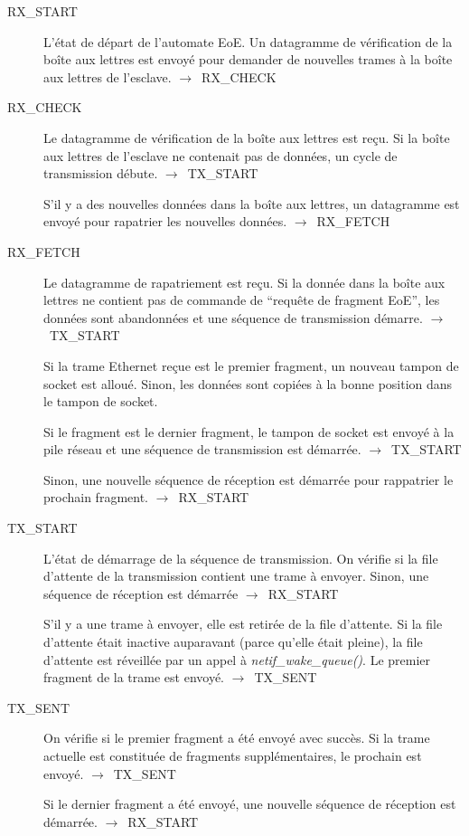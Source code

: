 \documentclass[a4paper,12pt,BCOR=6mm,bibtotoc,idxtotoc]{scrbook}
\begin{document}
\begin{description}
\item[RX\_START] L'\'etat de d\'epart de l'automate EoE.  Un datagramme de
  v\'erification de la bo\^ite aux lettres est envoy\'e pour demander de
  nouvelles trames \`a la bo\^ite aux lettres de
  l'esclave. $\rightarrow$~RX\_CHECK

\item[RX\_CHECK] Le datagramme de v\'erification de la bo\^ite aux lettres
  est re\c{c}u. Si la bo\^ite aux lettres de l'esclave ne contenait pas de
  donn\'ees, un cycle de transmission d\'ebute. $\rightarrow$~TX\_START

  S'il y a des nouvelles donn\'ees dans la bo\^ite aux lettres, un
  datagramme est envoy\'e pour rapatrier les nouvelles donn\'ees.
  $\rightarrow$~RX\_FETCH

\item[RX\_FETCH] Le datagramme de rapatriement est re\c{c}u.  Si la
  donn\'ee dans la bo\^ite aux lettres ne contient pas de commande de
  ``requ\^ete de fragment EoE'', les donn\'ees sont abandonn\'ees et une
  s\'equence de transmission d\'emarre.  $\rightarrow$~TX\_START

  Si la trame Ethernet re\c{c}ue est le premier fragment, un nouveau
  tampon de socket est allou\'e. Sinon, les donn\'ees sont copi\'ees
  \`a la bonne position dans le tampon de socket.

  Si le fragment est le dernier fragment, le tampon de socket est
  envoy\'e \`a la pile r\'eseau et une s\'equence de transmission est
  d\'emarr\'ee.  $\rightarrow$~TX\_START

  Sinon, une nouvelle s\'equence de r\'eception est d\'emarr\'ee pour
  rappatrier le prochain fragment.  $\rightarrow$~RX\_\-START

\item[TX\_START] L'\'etat de d\'emarrage de la s\'equence de
  transmission.  On v\'erifie si la file d'attente de la transmission
  contient une trame \`a envoyer. Sinon, une s\'equence de r\'eception
  est d\'emarr\'ee $\rightarrow$~RX\_START

  S'il y a une trame \`a envoyer, elle est retir\'ee de la file
  d'attente. Si la file d'attente \'etait inactive auparavant (parce
  qu'elle \'etait pleine), la file d'attente est r\'eveill\'ee par un
  appel \`a \textit{netif\_wake\_queue()}.  Le premier fragment de la
  trame est envoy\'e.  $\rightarrow$~TX\_SENT

\item[TX\_SENT] On v\'erifie si le premier fragment a \'et\'e envoy\'e
  avec succ\`es. Si la trame actuelle est constitu\'ee de fragments
  suppl\'ementaires, le prochain est envoy\'e.  $\rightarrow$~TX\_SENT

  Si le dernier fragment a \'et\'e envoy\'e, une nouvelle s\'equence
  de r\'eception est d\'emarr\'ee.  $\rightarrow$~RX\_START

\end{description}
\end{document}
